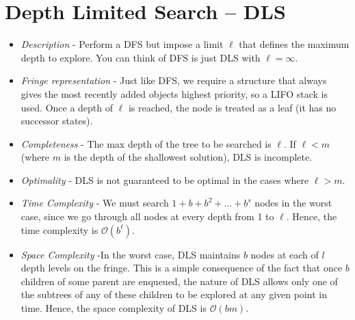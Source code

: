 \documentclass{article}[letterpaper]
\begin{document}
\section*{Depth Limited Search -- DLS}
\begin{itemize}
\item \textit{Description} - Perform a DFS but impose a limit $\ell$ that defines the maximum depth to explore.  You
can think of DFS is just DLS with $\ell = \infty$.

\item \textit{Fringe representation} - Just like DFS, we require a structure that
always gives the most recently added objects highest priority, so a LIFO stack is used.  Once a depth of $\ell$ 
is reached, the node is treated as a leaf (it has no successor states).

\item \textit{Completeness} - The max depth of the tree to be searched is $\ell$.  If $\ell < m$ (where $m$ is the depth
of the shallowest solution), DLS is incomplete.  

\item \textit{Optimality} -  DLS is not guaranteed to be optimal in the cases where $\ell > m$.  

\item \textit{Time Complexity} - We must search $1+b+b^2+...+b^s$ nodes in the worst case, since we go through all nodes at every depth from 1 to $\ell$. Hence, the time complexity is $\mathcal{O}(b^{\ell})$.

\item \textit{Space Complexity} -In the worst case, DLS maintains $b$ nodes at each of $l$ depth levels on the fringe.
This is a simple consequence of the fact that once $b$ children of some parent are enqueued, the nature
of DLS allows only one of the subtrees of any of these children to be explored at any given point in
time. Hence, the space complexity of DLS is $\mathcal{O}(bm)$.


\end{itemize}
\end{document}
